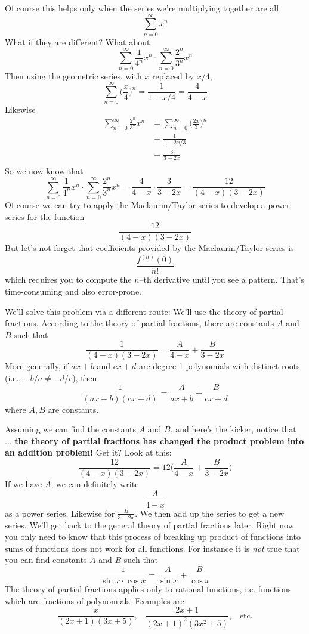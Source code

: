 \newpage
Of course this helps only when the series we're multiplying
together are all
\[
\sum_{n=0}^\infty x^n
\]
What if they are different?
What about 
\[
\sum_{n=0}^\infty \frac{1}{4^n} x^n 
\cdot 
\sum_{n=0}^\infty \frac{2^n}{3^n} x^n 
\]
Then using the geometric series, with $x$ replaced by $x/4$,
\[
\sum_{n=0}^\infty \biggl( \frac{x}{4} \biggr) ^n = \frac{1}{1-x/4}
= \frac{4}{4 - x}
\]
Likewise
\begin{align*}
\sum_{n=0}^\infty \frac{2^n}{3^n} x^n 
&= \sum_{n=0}^\infty \biggr( \frac{2x}{3} \biggl)^n \\
&= \frac{1}{1 - 2x/3} \\
&= \frac{3}{3 - 2x} \\
\end{align*}
So we now know that
\[
\sum_{n=0}^\infty \frac{1}{4^n} x^n 
\cdot 
\sum_{n=0}^\infty \frac{2^n}{3^n} x^n 
= \frac{4}{4 - x} \cdot  \frac{3}{3 - 2x}
= \frac{12}{(4-x)(3-2x)} 
\]
Of course we can try to 
apply the Maclaurin/Taylor series to develop a power series for the 
function
\[
\frac{12}{(4-x)(3-2x)} 
\]
But let's not forget that coefficients provided by the Maclaurin/Taylor
series is
\[
\frac{f^{(n)}(0)}{n!}
\]
which requires you to compute the $n$--th derivative until you see
a pattern.
That's time-consuming and also error-prone.

We'll solve this problem via a different route:
We'll use the theory of partial fractions.
According to the theory of partial fractions, there are constants $A$ and $B$ such that
\[
\frac{1}{(4-x)(3-2x)}
=
\frac{A}{4-x} +
\frac{B}{3-2x}
\]
More generally, if $ax + b$ and $cx + d$ are degree 1 polynomials with
distinct roots (i.e., $-b/a \neq -d/c$), then  
\[
\frac{1}{(ax+b)(cx+d)}
=
\frac{A}{ax+b} +
\frac{B}{cx+d}
\]
where $A,B$ are constants.

Assuming we can find the constants $A$ and $B$, and here's the
kicker, notice that ... \textbf{the theory of partial fractions has
changed the product problem into an addition problem!}
Get it? Look at this:
\[
\frac{12}{(4-x)(3-2x)} 
= 12 \biggl( 
\frac{A}{4-x} +
\frac{B}{3-2x}
\biggr)
\]
If we have $A$, we can definitely write 
\[
\frac{A}{4-x}
\]
as a power series.
Likewise for $\displaystyle \frac{B}{3-2x}$.
We then add up the series to get a new series.
We'll get back to the general theory of partial fractions later.
Right now you only need to know that 
this process of breaking up product of functions into sums of functions
does not work for all functions.
For instance it is \textit{not} true that you can find constants $A$ and $B$
such that
\[
\frac{1}{\sin x \cdot \cos x}
=
\frac{A}{\sin x} + 
\frac{B}{\cos x}
\]
The theory of partial fractions applies only to rational functions, 
i.e. functions which are fractions of polynomials.
Examples are
\[
\frac{x}{(2x + 1)(3x+5)}, \,\,\,\,\,
\frac{2x + 1}{(2x + 1)^2(3x^2+5)}, \,\,\,\,\,
\text{etc.}
\]

